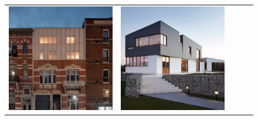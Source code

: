 \begin{figure}[H]
{\begin{tabular}{@{}ccccc@{}}
      \includegraphics[width=\linewidth]{Images/LoRAs/Geleding/Training_images/13.jpg} &
      \includegraphics[width=\linewidth]{Images/LoRAs/Geleding/Training_images/14.jpg} &

\end{tabular}}
\end{figure}
